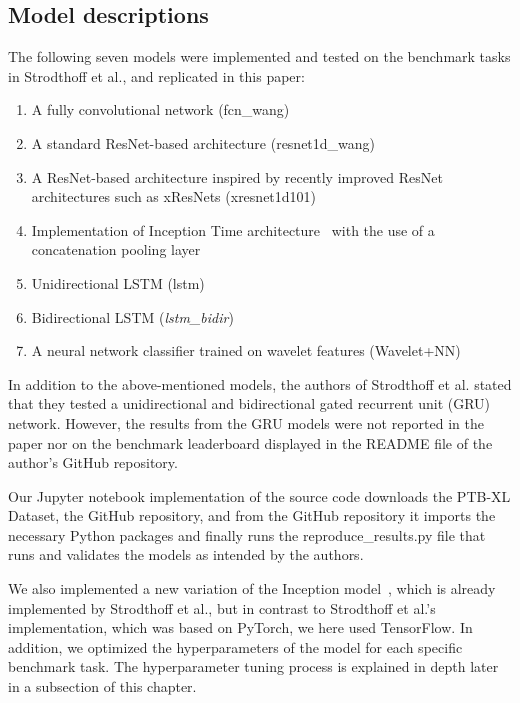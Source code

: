 \subsection{Model descriptions}

The following seven models were implemented and tested on the benchmark tasks in Strodthoff et al., and replicated in this paper:
\begin{enumerate}[noitemsep,topsep=1pt]
    \item A fully convolutional network (fcn\_wang)~\cite{wang_time_2017}
    \item A standard ResNet-based architecture (resnet1d\_wang)~\cite{wang_time_2017, he_deep_2016}
    \item A ResNet-based architecture inspired by recently improved ResNet architectures such as xResNets (xresnet1d101)~\cite{he_bag_2019}
    \item Implementation of Inception Time architecture~\cite{ismail_fawaz_et_al_inceptiontime_2020} with the use of a concatenation pooling layer 
    \item Unidirectional LSTM (lstm)~\cite{hochreiter_long_1997}
    \item Bidirectional LSTM (\textit{lstm\_bidir})~\cite{hochreiter_long_1997}
    \item A neural network classifier trained on wavelet features (Wavelet+NN) ~\cite{sharma_inferior_2018}\newline
\end{enumerate}

In addition to the above-mentioned models, the authors of Strodthoff et al. stated that they tested a unidirectional and bidirectional gated recurrent unit (GRU) network. However, the results from the GRU models were not reported in the paper nor on the benchmark leaderboard displayed in the README file of the author's GitHub repository. 

Our Jupyter notebook implementation of the source code downloads the PTB-XL Dataset, the GitHub repository, and from the GitHub repository it imports the necessary Python packages and finally runs the reproduce\_results.py file that runs and validates the models as intended by the authors.

We also implemented a new variation of the Inception model~\cite{ismail_fawaz_et_al_inceptiontime_2020}, which is already implemented by Strodthoff et al., but in contrast to Strodthoff et al.'s implementation, which was based on PyTorch, we here used TensorFlow. In addition, we optimized the hyperparameters of the model for each specific benchmark task. The hyperparameter tuning process is explained in depth later in a subsection of this chapter.

